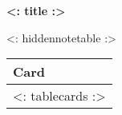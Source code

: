 \usepackage{longtable}


\begin{center}
  \textbf{<: title :>}

  \medskip

  <: hiddennotetable :>

  \bigskip

  \begin{longtable}{|p{}|}
    \hline
    \textbf{Card}\\\hline\endhead
    <: tablecards :>
  \end{longtable}
\end{center}



